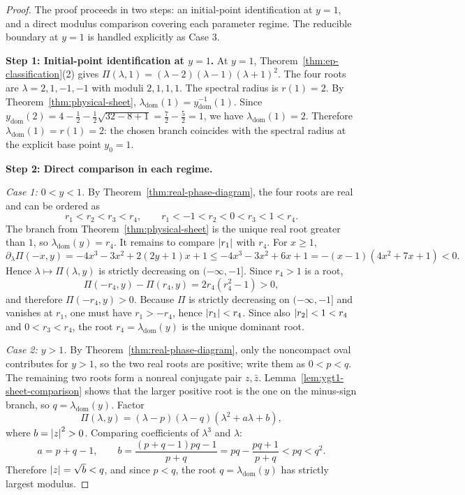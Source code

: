 \begin{proof}
The proof proceeds in two steps: an initial-point identification at $y=1$, and a direct modulus comparison covering each parameter regime.
The reducible boundary at $y=1$ is handled explicitly as Case 3.

\medskip
\noindent\textbf{Step 1: Initial-point identification at $y=1$.}
At $y=1$, Theorem~\ref{thm:ep-classification}(2) gives $\Pi(\lambda,1)=(\lambda-2)(\lambda-1)(\lambda+1)^2$.
The four roots are $\lambda=2,1,-1,-1$ with moduli $2,1,1,1$.
The spectral radius is $r(1)=2$.
By Theorem~\ref{thm:physical-sheet}, $\lambda_{\mathrm{dom}}(1)=y_{\mathrm{dom}}^{-1}(1)$.
Since $y_{\mathrm{dom}}(2)=4-\tfrac12-\tfrac12\sqrt{32-8+1}=\tfrac72-\tfrac{5}{2}=1$, we have $\lambda_{\mathrm{dom}}(1)=2$.
Therefore $\lambda_{\mathrm{dom}}(1)=r(1)=2$: the chosen branch coincides with the spectral radius at the explicit base point $y_0=1$.

\medskip
\noindent\textbf{Step 2: Direct comparison in each regime.}

\noindent\textit{Case 1: $0<y<1$.}
By Theorem~\ref{thm:real-phase-diagram}, the four roots are real and can be ordered as
\[
r_1<r_2<r_3<r_4,
\qquad
r_1<-1<r_2<0<r_3<1<r_4.
\]
The branch from Theorem~\ref{thm:physical-sheet} is the unique real root greater than \(1\), so \(\lambda_{\mathrm{dom}}(y)=r_4\).
It remains to compare \(\left\lvert r_1\right\rvert\) with \(r_4\).
For \(x\ge 1\),
\[
\partial_\lambda\Pi(-x,y)
=
-4x^3-3x^2+2(2y+1)x+1
\le
-4x^3-3x^2+6x+1
=
-(x-1)(4x^2+7x+1)<0.
\]
Hence \(\lambda\mapsto \Pi(\lambda,y)\) is strictly decreasing on \((-\infty,-1]\).
Since \(r_4>1\) is a root,
\[
\Pi(-r_4,y)-\Pi(r_4,y)=2r_4(r_4^2-1)>0,
\]
and therefore \(\Pi(-r_4,y)>0\).
Because \(\Pi\) is strictly decreasing on \((-\infty,-1]\) and vanishes at \(r_1\), one must have \(r_1>-r_4\), hence \(\left\lvert r_1\right\rvert<r_4\).
Since also \(\left\lvert r_2\right\rvert<1<r_4\) and \(0<r_3<r_4\), the root \(r_4=\lambda_{\mathrm{dom}}(y)\) is the unique dominant root.

\noindent\textit{Case 2: $y>1$.}
By Theorem~\ref{thm:real-phase-diagram}, only the noncompact oval contributes for \(y>1\), so the two real roots are positive; write them as \(0<p<q\).
The remaining two roots form a nonreal conjugate pair \(z,\bar z\).
Lemma~\ref{lem:ygt1-sheet-comparison} shows that the larger positive root is the one on the minus-sign branch, so \(q=\lambda_{\mathrm{dom}}(y)\).
Factor
\[
\Pi(\lambda,y)=(\lambda-p)(\lambda-q)(\lambda^2+a\lambda+b),
\]
where \(b=\left\lvert z\right\rvert^2>0\).
Comparing coefficients of \(\lambda^3\) and \(\lambda\):
\[
a=p+q-1,
\qquad
b=\frac{(p+q-1)pq-1}{p+q}=pq-\frac{pq+1}{p+q}<pq<q^2.
\]
Therefore \(\left\lvert z\right\rvert=\sqrt{b}<q\), and since \(p<q\), the root \(q=\lambda_{\mathrm{dom}}(y)\) has strictly largest modulus.


\end{proof}
